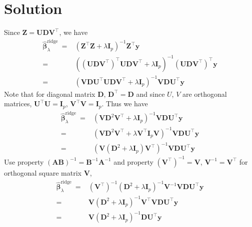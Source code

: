\documentclass[a4paper]{article}
\begin{document}
\section*{Solution}
Since $\mathbf{Z}=\mathbf{U D V}^{\top}$, we have 
\begin{equation}
	\begin{aligned}
		\hat{\boldsymbol{\beta}}_\lambda^{\text {ridge }} = & \left(\mathbf{Z}^{\top} \mathbf{Z}+\lambda \mathbf{I}_p\right)^{-1} \mathbf{Z}^{\top} \mathbf{y} \\
		= & \left((\mathbf{U D V}^{\top})^{\top} \mathbf{U D V}^{\top}+\lambda \mathbf{I}_p\right)^{-1} (\mathbf{U D V}^{\top})^{\top} \mathbf{y} \\
		= & \left(\mathbf{V D U}^{\top}\mathbf{U D V}^{\top}+\lambda \mathbf{I}_p\right)^{-1} \mathbf{V D U}^{\top} \mathbf{y}
	\end{aligned}
\end{equation}
Note that for diagonal matrix $\mathbf D$, $\mathbf D^\top = \mathbf D$ and since $U$, $V$ are orthogonal matrices, $\mathbf U^\top \mathbf U = \mathbf I_p$, $\mathbf V^\top \mathbf V = \mathbf I_p$. Thus we have
\begin{equation}
	\begin{aligned}
		\hat{\boldsymbol{\beta}}_\lambda^{\text {ridge }} = & \left(\mathbf{V D}^{2}\mathbf{V}^{\top}+\lambda \mathbf{I}_p\right)^{-1} \mathbf{V D U}^{\top} \mathbf{y} \\ 
		= & \left(\mathbf{V D}^{2}\mathbf{V}^{\top}+\lambda \mathbf V^\top \mathbf{I}_p \mathbf V\right)^{-1} \mathbf{V D U}^{\top} \mathbf{y} \\
		= & \left(\mathbf{V} \left(\mathbf{D}^{2}+\lambda\mathbf{I}_p\right)\mathbf{V}^{\top}\right)^{-1} \mathbf{V D U}^{\top} \mathbf{y}
	\end{aligned}
\end{equation}
Use property $(\mathbf{AB})^{-1} = \mathbf{B}^{-1} \mathbf{A}^{-1}$ and property $\left(\mathbf V^\top\right)^{-1} = \mathbf V$, $\mathbf V^{-1} = \mathbf V^\top$ for orthogonal square matrix $\mathbf V$,
\begin{equation}
	\begin{aligned}
		\hat{\boldsymbol{\beta}}_\lambda^{\text {ridge }} = & \left(\mathbf{V}^\top\right)^{-1} \left(\mathbf{D}^{2}+\lambda\mathbf{I}_p\right)^{-1}\mathbf{V}^{-1} \mathbf{V D U}^{\top} \mathbf{y} \\
		= & \mathbf V \left(\mathbf{D}^{2}+\lambda\mathbf{I}_p\right)^{-1}\mathbf{V}^{\top} \mathbf{V D U}^{\top} \mathbf{y} \\
		= & \mathbf V \left(\mathbf{D}^{2}+\lambda\mathbf{I}_p\right)^{-1} \mathbf{D U}^{\top} \mathbf{y}
	\end{aligned}
\end{equation}
\end{document}

